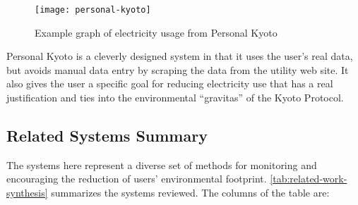 \begin{figure}[htbp]
	\centering
		\texttt{[image: personal-kyoto]}
		\caption{Example graph of electricity usage from Personal Kyoto}
		\label{fig:personal-kyoto}
\end{figure}

Personal Kyoto is a cleverly designed system in that it uses the user's real data, but avoids manual data entry by scraping the data from the utility web site. It also gives the user a specific goal for reducing electricity use that has a real justification and ties into the environmental ``gravitas'' of the Kyoto Protocol.

\subsection{Related Systems Summary}

The systems here represent a diverse set of methods for monitoring and encouraging the reduction of users' environmental footprint. \autoref{tab:related-work-synthesis} summarizes the systems reviewed. The columns of the table are:

